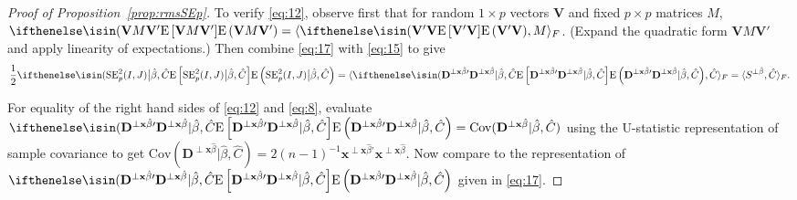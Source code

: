 \documentclass{article}
\theoremstyle{remark}
\begin{document}
\begin{proof}[Proof of Proposition~\ref{prop:rmsSEp}]
To verify \eqref{eq:12}, observe first that for random $1\times p$ vectors $\mathbf{V}$ and fixed $p\times p$ matrices $M$, $\E{\mathbf{V} M \mathbf{V}'} = \fip{\E{\mathbf{V}'\mathbf{V}}}{M}$.  (Expand the quadratic form $\mathbf{V} M \mathbf{V}'$ and apply linearity of expectations.)  Then combine \eqref{eq:17} with \eqref{eq:15} to give
\begin{equation*}
  \frac{1}{2}\E{ \mathrm{SE}_{p}^{2}(I,J) \big| \hat\beta, \hat{C} } = \fip{\E{ \mathbf{D}^{\perp \mathbf{x}\hat{\beta}\prime} \mathbf{D}^{\perp \mathbf{x}\hat{\beta}}| \hat\beta, \hat{C} }}{\hat{C}} = \fip{S^{\perp \hat{\beta}}}{\hat{C}}.
\end{equation*}

For equality of the right hand sides of \eqref{eq:12} and \eqref{eq:8}, evaluate $\E{\mathbf{D}^{\perp \mathbf{x}\hat{\beta}\prime}\mathbf{D}^{\perp \mathbf{x}\hat{\beta}} | \hat\beta, \hat{C}} = \mathrm{Cov}(\mathbf{D}^{\perp \mathbf{x}\hat{\beta}} | \hat\beta, \hat{C})$ using the U-statistic representation of sample covariance to get $\mathrm{Cov}(\mathbf{D}^{\perp \mathbf{x}\hat{\beta}} | \hat\beta, \hat{C}) = 2(n-1)^{-1}\mathbf{x}^{\perp \mathbf{x}\hat\beta \prime}\mathbf{x}^{\perp \mathbf{x}\hat\beta}$.   Now compare to the representation of $\E{\mathbf{D}^{\perp \mathbf{x}\hat{\beta}\prime}\mathbf{D}^{\perp \mathbf{x}\hat{\beta}} | \hat\beta, \hat{C}}$ given in \eqref{eq:17}.



\end{proof}
\end{document}
